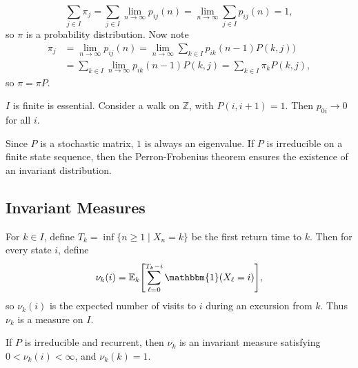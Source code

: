 \documentclass[12pt]{article}
\begin{document}
\begin{proofbox}
	\[
		\sum_{j \in I}\pi_j = \sum_{j \in I}\lim_{n \to \infty}p_{ij}(n) = \lim_{n \to \infty}\sum_{j \in I}p_{ij}(n) = 1,
	\]
	so $\pi$ is a probability distribution. Now note
	\begin{align*}
		\pi_j &= \lim_{n \to \infty}p_{ij}(n) = \lim_{n \to \infty} \sum_{k \in I}p_{ik}(n-1) P(k, j)) \\
		    &= \sum_{k \in I}\lim_{n \to \infty}p_{ik}(n-1) P(k, j) = \sum_{k \in I}\pi_k P(k, j),
	\end{align*}
	so $\pi = \pi P$.
\end{proofbox}
\begin{remark}
	$I$ is finite is essential. Consider a walk on $\mathbb{Z}$, with $P(i, i+1) = 1$. Then $p_{0i} \to 0$ for all $i$.

	Since $P$ is a stochastic matrix, $1$ is always an eigenvalue. If $P$ is irreducible on a finite state sequence, then the Perron-Frobenius theorem ensures the existence of an invariant distribution.
\end{remark}

\subsection{Invariant Measures}%
\label{sub:invariant_measures}

\begin{definition}
	For $k \in I$, define $T_k = \inf\{n \geq 1 \mid X_n = k\}$ be the first return time to $k$. Then for every state $i$, define
	\[
		\nu_k(i) = \mathbb{E}_k\Biggl[ \sum_{\ell = 0}^{T_k - i} \mathbbm{1}(X_{\ell} = i) \Biggr]
	,\]
	so $\nu_k(i)$ is the expected number of visits to $i$ during an excursion from $k$. Thus $\nu_k$ is a measure on $I$.
\end{definition}

\begin{theorem}
	If $P$ is irreducible and recurrent, then $\nu_k$ is an invariant measure satisfying $0 < \nu_k(i) < \infty$, and $\nu_k(k) = 1$.
\end{theorem}
\end{document}
